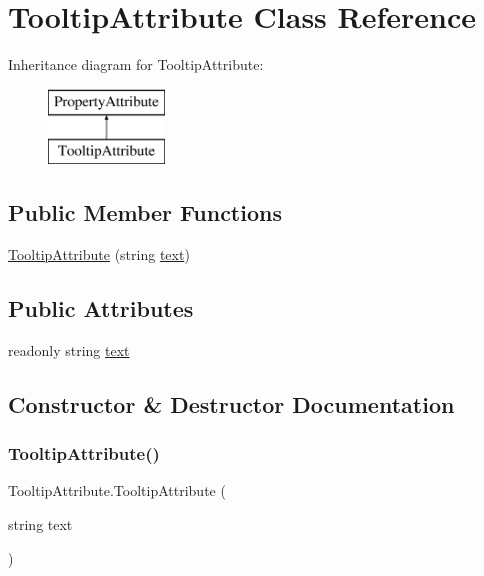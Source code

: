 \hypertarget{class_tooltip_attribute}{}\section{Tooltip\+Attribute Class Reference}
\label{class_tooltip_attribute}
Inheritance diagram for Tooltip\+Attribute\+:\begin{figure}[H]
\begin{center}
\leavevmode
\includegraphics[height=2.000000cm]{class_tooltip_attribute}
\end{center}
\end{figure}
\subsection*{Public Member Functions}
\begin{DoxyCompactItemize}
\item 
\hyperlink{class_tooltip_attribute_a982a45f38f9ac2c758bc23b9c841c3e8}{Tooltip\+Attribute} (string \hyperlink{class_tooltip_attribute_a8a97f74ce0168aad448c16f69b786e6b}{text})
\end{DoxyCompactItemize}
\subsection*{Public Attributes}
\begin{DoxyCompactItemize}
\item 
readonly string \hyperlink{class_tooltip_attribute_a8a97f74ce0168aad448c16f69b786e6b}{text}
\end{DoxyCompactItemize}


\subsection{Constructor \& Destructor Documentation}
\mbox{\label{class_tooltip_attribute_a982a45f38f9ac2c758bc23b9c841c3e8}} 
\subsubsection{\texorpdfstring{Tooltip\+Attribute()}{TooltipAttribute()}}
{\footnotesize\ttfamily Tooltip\+Attribute.\+Tooltip\+Attribute (\begin{DoxyParamCaption}\item[{string}]{text }\end{DoxyParamCaption})}



